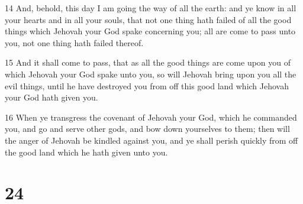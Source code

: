 \par 14 And, behold, this day I am going the way of all the earth: and ye know in all your hearts and in all your souls, that not one thing hath failed of all the good things which Jehovah your God spake concerning you; all are come to pass unto you, not one thing hath failed thereof.
\par 15 And it shall come to pass, that as all the good things are come upon you of which Jehovah your God spake unto you, so will Jehovah bring upon you all the evil things, until he have destroyed you from off this good land which Jehovah your God hath given you.
\par 16 When ye transgress the covenant of Jehovah your God, which he commanded you, and go and serve other gods, and bow down yourselves to them; then will the anger of Jehovah be kindled against you, and ye shall perish quickly from off the good land which he hath given unto you.

\chapter{24}

